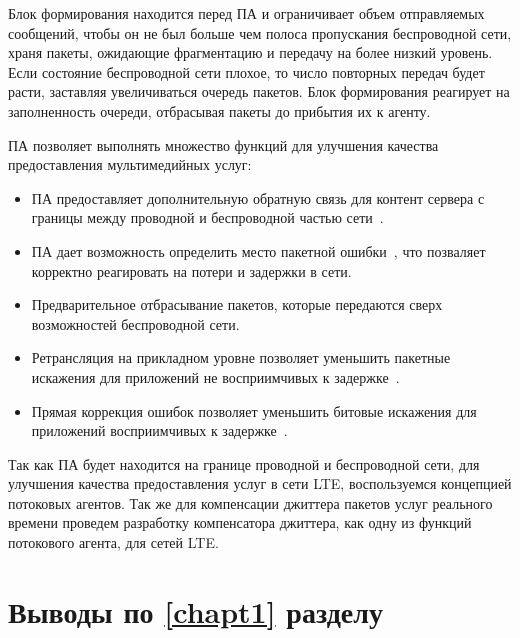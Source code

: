 Блок формирования находится перед ПА и ограничивает объем отправляемых сообщений, чтобы он не был больше чем полоса пропускания беспроводной сети, храня пакеты, ожидающие фрагментацию и передачу на более низкий уровень. Если состояние беспроводной сети плохое, то число повторных передач будет расти, заставляя увеличиваться очередь пакетов. Блок формирования реагирует на заполненность очереди, отбрасывая пакеты до прибытия их к агенту.

ПА позволяет выполнять множество функций для улучшения качества предоставления мультимедийных услуг:
\begin{itemize}
\item ПА предоставляет дополнительную обратную связь для контент сервера с границы между проводной  и беспроводной частью сети \cite{SAdouble_feedback}.
\item ПА дает возможность определить место пакетной ошибки \cite{SAdouble_feedback}, что позваляет корректно реагировать на потери и задержки в сети.
\item Предварительное отбрасывание пакетов, которые передаются сверх возможностей беспроводной сети.
\item Ретрансляция на прикладном уровне позволяет уменьшить  пакетные искажения  для приложений не восприимчивых к задержке \cite{SArateOpt, SArealtime}.
\item Прямая коррекция ошибок позволяет уменьшить битовые искажения для приложений восприимчивых к задержке \cite{SArateOpt, SArealtime}.
\end{itemize}

Так как ПА будет находится на границе проводной и беспроводной сети, для улучшения качества предоставления услуг в сети LTE, воспользуемся концепцией потоковых агентов. Так же для компенсации джиттера пакетов услуг реального времени проведем разработку компенсатора джиттера, как одну из функций потокового агента, для сетей LTE.


\section{Выводы по \ref{chapt1} разделу } \label{sect_sa}

